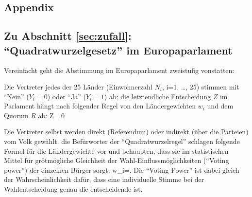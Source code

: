 \begin{appendix}

\chapter{Appendix}


\section{\label{sec:App-quadratwurzel}Zu Abschnitt \protect\ref{sec:zufall}: 
``Quadratwurzelgesetz'' im Europaparlament}


Vereinfacht geht die Abstimmung im Europaparlament zweistufig
vonstatten:
\bi
\item Die Vertreter jedes der 25 L\"ander (Einwohnerzahl $N_i$, i=1,
\ldots,  25) stimmen mit ``Nein'' ($Y_i=0$) oder ``Ja'' ($Y_i=1$) ab; 
die letztendliche Entscheidung $Z$ im Parlament h\"angt nach folgender
Regel von den L\"andergewichten $w_i$ und dem Quorum $R$ ab:
\bdm
Z=
      {0 }{}
\edm

\item Die Vertreter selbst werden direkt (Referendum) oder indirekt
(\"uber die Parteien) vom Volk gew\"ahlt.
\ei
die Bef\"urworter der ``Quadratwurzelregel'' schlagen folgende Formel f\"ur die
L\"andergewichte vor und behaupten, dass sie im
statistischen Mittel f\"ur gr\"o\3tm\"ogliche
Gleichheit der Wahl-Einflussm\"oglichkeiten (``Voting power'') der
einzelnen B\"urger sorgt:
\bdm
w_i=.
\edm
Die ``Voting Power'' ist dabei  gleich der Wahrscheinlichkeit daf\"ur, dass
eine individuelle Stimme bei der Wahlentscheidung genau die entscheidende
ist. 



\end{appendix}
